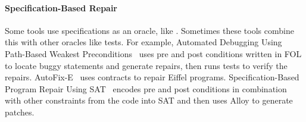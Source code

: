 









\paragraph{Specification-Based Repair} Some tools use specifications as an oracle, like \sysname.
Sometimes these tools combine this with other oracles like tests. %
For example, Automated Debugging Using Path-Based Weakest Preconditions~\cite{10.1007/978-3-540-24721-0_20} %
uses pre and post conditions written in FOL to locate buggy statements and generate repairs, 
then runs tests to verify the repairs. 
AutoFix-E~\cite{Wei:2010:AFP:1831708.1831716, pei2014automated} uses contracts
to repair Eiffel programs. %
Specification-Based Program Repair Using SAT~\cite{gopinath2011specification} %
encodes pre and post conditions in combination with other constraints from the code %
into SAT and then uses Alloy to generate patches. %

